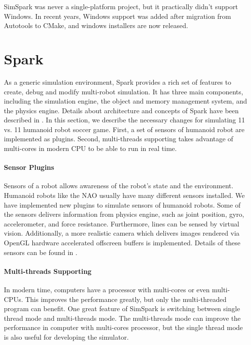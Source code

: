 \documentclass{llncs}
\begin{document}
SimSpark was never a single-platform project, but it practically didn't support 
Windows. In recent years, Windows support was added after migration from Autotools
to CMake, and windows installers are now released. 

\section{Spark}
\label{s:spark}
As a generic simulation environment, Spark provides a rich set of features to create, debug and modify multi-robot simulation.
It has three main components, including the simulation engine, the object and memory management system, and the physics engine. Details about architecture and concepts of Spark have been described in \cite{Boedecker2008,OR05}.
In this section, we describe the necessary changes for simulating 11 vs. 11 humanoid robot soccer game.
First, a set of sensors of humanoid robot are implemented as plugins. Second, multi-threads supporting takes advantage of multi-cores in modern CPU to be able to run in real time.

\paragraph{Sensor Plugins}
Sensors of a robot allows awareness of the robot's state and the environment.
Humanoid robots like the NAO usually have many different sensors installed.
We have implemented new plugins to simulate sensors of humanoid robots.
Some of the sensors delivers information from physics engine, such as joint position, gyro, accelerometer, and force resistance. Furthermore, lines can be sensed by virtual vision.
Additionally, a more realistic camera which delivers images rendered via OpenGL hardware accelerated offscreen buffers is implemented. Details of these sensors can be found in \cite{usermanual}.

\paragraph{Multi-threads Supporting}
In modern time, computers have a processor with multi-cores or even multi-CPUs.
This improves the performance greatly, but only the multi-threaded program can benefit.
One great feature of SimSpark is switching between single thread mode and multi-threads
mode. The multi-threads mode can improve the performance in computer with multi-cores processor, but the single thread mode is also useful for developing the simulator. 
\end{document}

